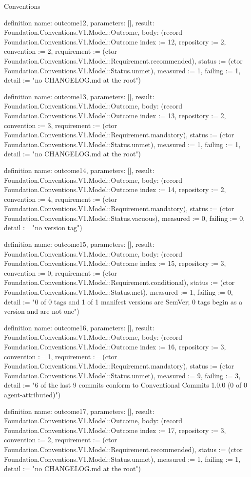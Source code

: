 \begin{lexlean}{Conventions}
\begin{semanticmodule}
definition{
  name: outcome12,
  parameters: [],
  result: Foundation.Conventions.V1.Model::Outcome,
  body: (record Foundation.Conventions.V1.Model::Outcome {index := 12, repository := 2, convention := 2, requirement := (ctor Foundation.Conventions.V1.Model::Requirement.recommended), status := (ctor Foundation.Conventions.V1.Model::Status.unmet), measured := 1, failing := 1, detail := "no CHANGELOG.md at the root"})
}

definition{
  name: outcome13,
  parameters: [],
  result: Foundation.Conventions.V1.Model::Outcome,
  body: (record Foundation.Conventions.V1.Model::Outcome {index := 13, repository := 2, convention := 3, requirement := (ctor Foundation.Conventions.V1.Model::Requirement.mandatory), status := (ctor Foundation.Conventions.V1.Model::Status.unmet), measured := 1, failing := 1, detail := "no CHANGELOG.md at the root"})
}

definition{
  name: outcome14,
  parameters: [],
  result: Foundation.Conventions.V1.Model::Outcome,
  body: (record Foundation.Conventions.V1.Model::Outcome {index := 14, repository := 2, convention := 4, requirement := (ctor Foundation.Conventions.V1.Model::Requirement.mandatory), status := (ctor Foundation.Conventions.V1.Model::Status.vacuous), measured := 0, failing := 0, detail := "no version tag"})
}

definition{
  name: outcome15,
  parameters: [],
  result: Foundation.Conventions.V1.Model::Outcome,
  body: (record Foundation.Conventions.V1.Model::Outcome {index := 15, repository := 3, convention := 0, requirement := (ctor Foundation.Conventions.V1.Model::Requirement.conditional), status := (ctor Foundation.Conventions.V1.Model::Status.met), measured := 1, failing := 0, detail := "0 of 0 tags and 1 of 1 manifest versions are SemVer; 0 tags begin as a version and are not one"})
}

definition{
  name: outcome16,
  parameters: [],
  result: Foundation.Conventions.V1.Model::Outcome,
  body: (record Foundation.Conventions.V1.Model::Outcome {index := 16, repository := 3, convention := 1, requirement := (ctor Foundation.Conventions.V1.Model::Requirement.mandatory), status := (ctor Foundation.Conventions.V1.Model::Status.unmet), measured := 9, failing := 3, detail := "6 of the last 9 commits conform to Conventional Commits 1.0.0 (0 of 0 agent-attributed)"})
}

definition{
  name: outcome17,
  parameters: [],
  result: Foundation.Conventions.V1.Model::Outcome,
  body: (record Foundation.Conventions.V1.Model::Outcome {index := 17, repository := 3, convention := 2, requirement := (ctor Foundation.Conventions.V1.Model::Requirement.recommended), status := (ctor Foundation.Conventions.V1.Model::Status.unmet), measured := 1, failing := 1, detail := "no CHANGELOG.md at the root"})
}


\end{semanticmodule}
\end{lexlean}
